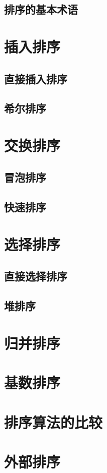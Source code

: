 \documentclass[lang=cn,newtx,10pt,scheme=chinese]{elegantbook}
\begin{document}
\subsection{排序的基本术语}

\section{插入排序}

\subsection{直接插入排序}

\subsection{希尔排序}

\section{交换排序}

\subsection{冒泡排序}

\subsection{快速排序}

\section{选择排序}

\subsection{直接选择排序}

\subsection{堆排序}

\section{归并排序}

\section{基数排序}

\section{排序算法的比较}

\section{外部排序}
\end{document}
